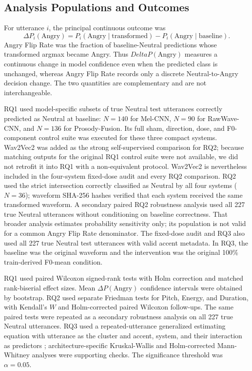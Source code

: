 \documentclass[a4paper,runningheads]{llncs}
\begin{document}
\subsection{Analysis Populations and Outcomes}

For utterance $i$, the principal continuous outcome was
\begin{equation}
\Delta P_i(\mathrm{Angry})=P_i(\mathrm{Angry}\mid\mathrm{transformed})-P_i(\mathrm{Angry}\mid\mathrm{baseline}).
\end{equation}
Angry Flip Rate was the fraction of baseline-Neutral predictions whose transformed argmax became Angry. Thus $Delta P(\mathrm{Angry})$ measures a continuous change in model confidence even when the predicted class is unchanged, whereas Angry Flip Rate records only a discrete Neutral-to-Angry decision change. The two quantities are complementary and are not interchangeable.

RQ1 used model-specific subsets of true Neutral test utterances correctly predicted as Neutral at baseline: $N=140$ for Mel-CNN, $N=90$ for RawWave-CNN, and $N=136$ for Prosody-Fusion. Its full sham, direction, dose, and F0-component control suite was executed for these three compact systems. Wav2Vec2 was added as the strong self-supervised comparison for RQ2; because matching outputs for the original RQ1 control suite were not available, we did not retrofit it into RQ1 with a non-equivalent protocol. Wav2Vec2 is nevertheless included in the four-system fixed-dose audit and every RQ2 comparison. RQ2 used the strict intersection correctly classified as Neutral by all four systems ($N=36$); waveform SHA-256 hashes verified that each system received the same transformed waveform. A secondary paired RQ2 robustness analysis used all 227 true Neutral utterances without conditioning on baseline correctness. That broader analysis estimates probability sensitivity only; its population is not valid for a common Angry Flip Rate denominator. The fixed-dose audit and RQ3 also used all 227 true Neutral test utterances with valid accent metadata. In RQ3, the baseline was the original waveform and the intervention was the original 100\% train-derived F0-mean condition.

RQ1 used paired Wilcoxon signed-rank tests with Holm correction and matched rank-biserial effect sizes. Mean $\Delta P(\mathrm{Angry})$ confidence intervals were obtained by bootstrap. RQ2 used separate Friedman tests for Pitch, Energy, and Duration, with Kendall's $W$ and Holm-corrected paired Wilcoxon follow-ups. The same paired tests were repeated as a secondary robustness analysis on all 227 true Neutral utterances. RQ3 used a repeated-utterance generalized estimating equation with utterance as the cluster and accent, system, and their interaction as predictors \cite{liang1986gee}; architecture-specific Kruskal-Wallis and Holm-corrected Mann-Whitney analyses were supporting checks. The significance threshold was $\alpha=0.05$.
\end{document}
